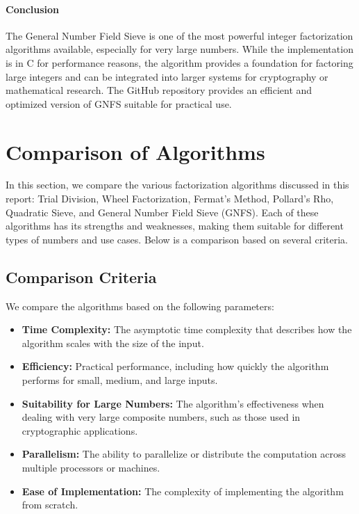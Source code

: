 \documentclass[12pt]{report}
\begin{document}
\paragraph{Conclusion}
The General Number Field Sieve is one of the most powerful integer factorization algorithms available, especially for very large numbers. While the implementation is in C for performance reasons, the algorithm provides a foundation for factoring large integers and can be integrated into larger systems for cryptography or mathematical research. The GitHub repository provides an efficient and optimized version of GNFS suitable for practical use.

\section{Comparison of Algorithms}

In this section, we compare the various factorization algorithms discussed in this report: Trial Division, Wheel Factorization, Fermat’s Method, Pollard's Rho, Quadratic Sieve, and General Number Field Sieve (GNFS). Each of these algorithms has its strengths and weaknesses, making them suitable for different types of numbers and use cases. Below is a comparison based on several criteria.

\subsection{Comparison Criteria}
We compare the algorithms based on the following parameters:
\begin{itemize}
    \item \textbf{Time Complexity:} The asymptotic time complexity that describes how the algorithm scales with the size of the input.
    \item \textbf{Efficiency:} Practical performance, including how quickly the algorithm performs for small, medium, and large inputs.
    \item \textbf{Suitability for Large Numbers:} The algorithm's effectiveness when dealing with very large composite numbers, such as those used in cryptographic applications.
    \item \textbf{Parallelism:} The ability to parallelize or distribute the computation across multiple processors or machines.
    \item \textbf{Ease of Implementation:} The complexity of implementing the algorithm from scratch.
\end{itemize}
\end{document}

